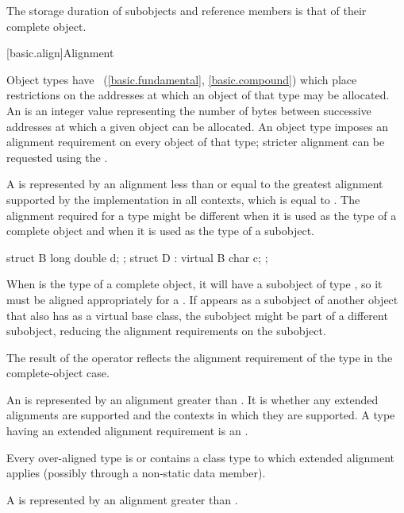 \pnum
{}%
The storage duration of subobjects and reference members
is that of their complete object.
%

[basic.align]{Alignment}

\pnum
Object types have ~(\ref{basic.fundamental}, \ref{basic.compound})
which place restrictions on the addresses at which an object of that type
may be allocated. An  is an 
integer value representing the number of bytes between successive addresses
at which a given object can be allocated. An object type imposes an alignment
requirement on every object of that type; stricter alignment can be requested
using the .

\pnum
{}%
A  is represented by an alignment
less than or equal to the greatest alignment supported by the implementation in
all contexts, which is equal to
.
The alignment required for a type might be different when it is used as the type
of a complete object and when it is used as the type of a subobject.
\begin{example}
\begin{codeblock}
struct B { long double d; };
struct D : virtual B { char c; };
\end{codeblock}

When  is the type of a complete object, it will have a subobject of
type , so it must be aligned appropriately for a .
If  appears as a subobject of another object that also has 
as a virtual base class, the  subobject might be part of a different
subobject, reducing the alignment requirements on the  subobject.
\end{example}
The result of the  operator reflects the alignment
requirement of the type in the complete-object case.

\pnum
{}%
%
%
An  is represented by an alignment
greater than . It is 
whether any extended alignments are supported and the contexts in which they are
supported. A type having an extended alignment
requirement is an .
\begin{note}
Every over-aligned type is or contains a class type
to which extended alignment applies (possibly through a non-static data member).
\end{note}
A  is represented by
an alignment greater than .

